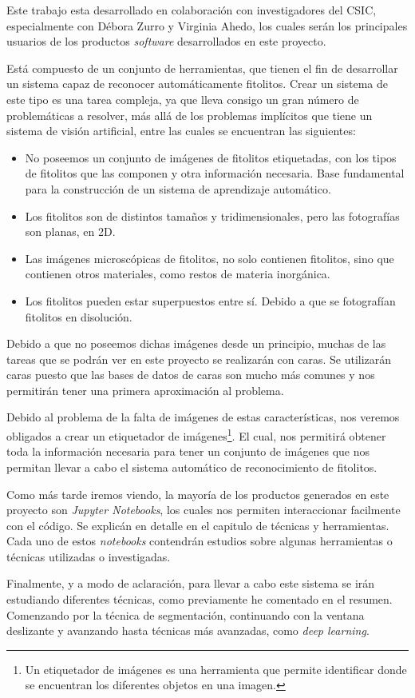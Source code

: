 

Este trabajo esta desarrollado en colaboración con investigadores del CSIC, especialmente con Débora Zurro y Virginia Ahedo, los cuales serán los principales usuarios de los productos \textit{software} desarrollados en este proyecto. 

Está compuesto de un conjunto de herramientas, que tienen el fin de desarrollar un sistema capaz de reconocer automáticamente fitolitos. Crear un sistema de este tipo es una tarea compleja, ya que lleva consigo un gran número de problemáticas a resolver, más allá de los problemas implícitos que tiene un sistema de visión artificial, entre las cuales se encuentran las siguientes:

\begin{itemize}
	\item No poseemos un conjunto de imágenes de fitolitos etiquetadas, con los tipos de fitolitos que las componen y otra información necesaria. Base fundamental para la construcción de un sistema de aprendizaje automático.
	\item Los fitolitos son de distintos tamaños y tridimensionales, pero las fotografías son planas, en 2D.
	\item Las imágenes microscópicas de fitolitos, no solo contienen fitolitos, sino que contienen otros materiales, como restos de materia inorgánica.
	\item Los fitolitos pueden estar superpuestos entre sí. Debido a que se fotografían fitolitos en disolución.
\end{itemize}

Debido a que no poseemos dichas imágenes desde un principio, muchas de las tareas que se podrán ver en este proyecto se realizarán con caras. Se utilizarán caras puesto que las bases de datos de caras son mucho más comunes y nos permitirán tener una primera aproximación al problema.

Debido al problema de la falta de imágenes de estas características, nos veremos obligados a crear un etiquetador de imágenes\footnote{Un etiquetador de imágenes es una herramienta que permite identificar donde se encuentran los diferentes objetos en una imagen.}. El cual, nos permitirá obtener toda la información necesaria para tener un conjunto de imágenes que nos permitan llevar a cabo el sistema automático de reconocimiento de fitolitos.

Como más tarde iremos viendo, la mayoría de los productos generados en este proyecto son \textit{Jupyter Notebooks}, los cuales nos permiten interaccionar facilmente con el código. Se explicán en detalle en el capitulo de técnicas y herramientas. Cada uno de estos \textit{notebooks} contendrán estudios sobre algunas herramientas o técnicas utilizadas o investigadas.

Finalmente, y a modo de aclaración, para llevar a cabo este sistema se irán estudiando diferentes técnicas, como previamente he comentado en el resumen. Comenzando por la técnica de segmentación, continuando con la ventana deslizante y avanzando hasta técnicas más avanzadas, como \textit{deep learning}\cite{deeplearning}.